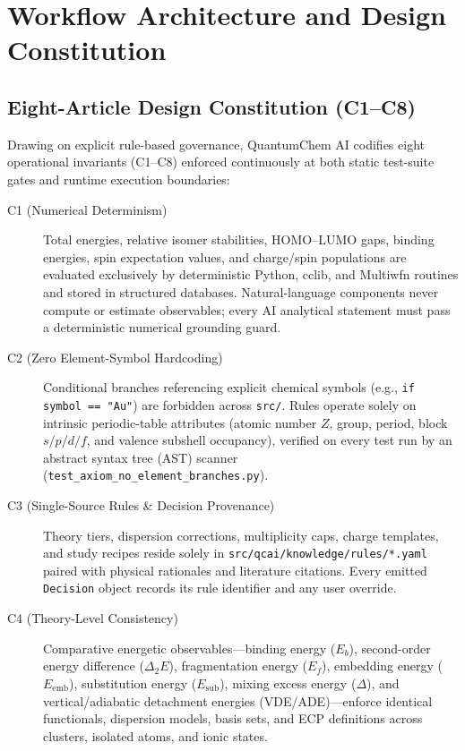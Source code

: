 \documentclass[journal=jctcce,manuscript=article]{achemso}
\begin{document}
\section{Workflow Architecture and Design Constitution}

\subsection{Eight-Article Design Constitution (C1--C8)}

Drawing on explicit rule-based governance,\cite{bai2022constitutional} QuantumChem AI codifies eight operational invariants (C1--C8) enforced continuously at both static test-suite gates and runtime execution boundaries:

\begin{description}
  \item[C1 (Numerical Determinism)] Total energies, relative isomer stabilities, HOMO--LUMO gaps, binding energies, spin expectation values, and charge/spin populations are evaluated exclusively by deterministic Python, cclib, and Multiwfn routines and stored in structured databases. Natural-language components never compute or estimate observables; every AI analytical statement must pass a deterministic numerical grounding guard.
  \item[C2 (Zero Element-Symbol Hardcoding)] Conditional branches referencing explicit chemical symbols (e.g., \texttt{if symbol == "Au"}) are forbidden across \texttt{src/}. Rules operate solely on intrinsic periodic-table attributes (atomic number $Z$, group, period, block $s/p/d/f$, and valence subshell occupancy), verified on every test run by an abstract syntax tree (AST) scanner (\texttt{test\_axiom\_no\_\allowbreak{}element\_branches.py}).
  \item[C3 (Single-Source Rules \& Decision Provenance)] Theory tiers, dispersion corrections, multiplicity caps, charge templates, and study recipes reside solely in \texttt{src/qcai/knowledge/rules/*.yaml} paired with physical rationales and literature citations. Every emitted \texttt{Decision} object records its rule identifier and any user override.
  \item[C4 (Theory-Level Consistency)] Comparative energetic observables---binding energy ($E_b$), second-order energy difference ($\Delta_2 E$), fragmentation energy ($E_f$), embedding energy ($E_{\text{emb}}$), substitution energy ($E_{\text{sub}}$), mixing excess energy ($\Delta$), and vertical/adiabatic detachment energies (VDE/ADE)---enforce identical functionals, dispersion models, basis sets, and ECP definitions across clusters, isolated atoms, and ionic states.

\end{description}
\end{document}

